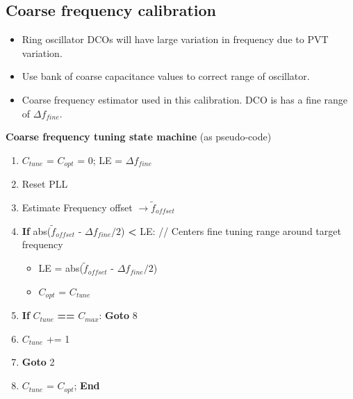 \documentclass[10pt,a4paper]{article}
\begin{document}
		\flushleft
		\subsection{Coarse frequency calibration}
		\begin{itemize}
			\vspace{-0.25em}
			\scriptsize
			\item Ring oscillator DCOs will have large variation in frequency due to PVT variation.
			\item Use bank of coarse capacitance values to correct range of oscillator.
			\item Coarse frequency estimator used in this calibration.  DCO is has a fine range of $\Delta f_{fine}$.
		\end{itemize} 	
		\vspace{-0.25em}
		\scriptsize
		\textbf{Coarse frequency tuning state machine} (as pseudo-code)
			\begin{enumerate}
				\scriptsize
				\item $C_{tune}$ = $C_{opt}$ = 0;\hspace{1em} LE = $\Delta f_{fine}$		
				\item Reset PLL
				\item Estimate Frequency offset $\rightarrow \tilde f_{offset}$
				\vspace{-0.2em}
				\item \textbf{If} abs($\tilde f_{offset}$ - $\Delta f_{fine}/2$)  \textbf{<} LE: \hspace{1em}\color{teal} // Centers fine tuning range around target frequency
				\color{black}
				\begin{itemize}
					\scriptsize
					\item LE = abs($\tilde f_{offset}$ - $\Delta f_{fine}/2$)
					\item $C_{opt}$ = $C_{tune}$
				\end{itemize}	
				\item \textbf{If} $C_{tune}$ \textbf{==} $C_{max}$: \textbf{Goto} 8		
				\item $C_{tune}$ += 1
				\item \textbf{Goto} 2
				\item $C_{tune}$ = $C_{opt}$; \textbf{End}
			\end{enumerate}
 

    \pagebreak

	
	{}
\end{document}
